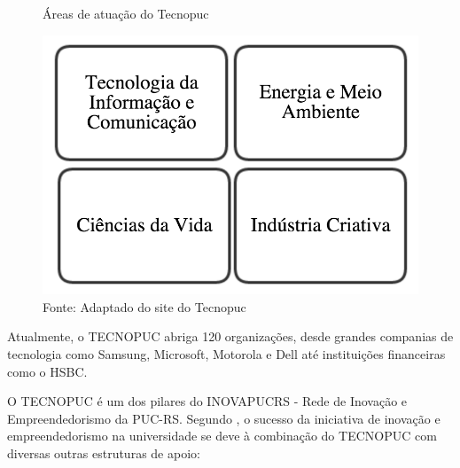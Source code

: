 \begin{figure}
\caption{Áreas de atuação do Tecnopuc}
\centerline{\includegraphics[scale=0.5]{img/tecnopuc}}
\label{fig:tecnopuc}
\caption* {Fonte: Adaptado do site do Tecnopuc}
\end{figure}

Atualmente, o TECNOPUC abriga 120 organizações, desde grandes companias de tecnologia como Samsung, Microsoft, Motorola e Dell até instituições financeiras como o HSBC. 

O TECNOPUC é um dos pilares do INOVAPUCRS - Rede de Inovação e Empreendedorismo da PUC-RS. Segundo , o sucesso da iniciativa de inovação e empreendedorismo na universidade se deve à combinação do TECNOPUC com diversas outras estruturas de apoio:

